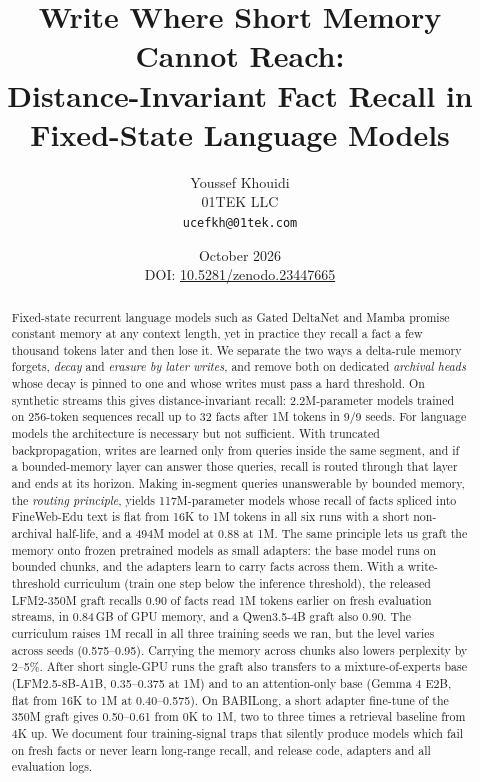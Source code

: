 \documentclass[11pt]{article}
\title{Write Where Short Memory Cannot Reach:\\Distance-Invariant Fact Recall in Fixed-State Language Models}
\author{Youssef Khouidi\\01TEK LLC\\\texttt{ucefkh@01tek.com}}
\date{October 2026\\[2pt]\small DOI: \href{https://doi.org/10.5281/zenodo.23447665}{10.5281/zenodo.23447665}}
\begin{document}
\maketitle

\begin{abstract}
Fixed-state recurrent language models such as Gated DeltaNet and Mamba promise constant memory at any context length, yet in practice they recall a fact a few thousand tokens later and then lose it. We separate the two ways a delta-rule memory forgets, \emph{decay} and \emph{erasure by later writes}, and remove both on dedicated \emph{archival heads} whose decay is pinned to one and whose writes must pass a hard threshold. On synthetic streams this gives distance-invariant recall: 2.2M-parameter models trained on 256-token sequences recall up to 32 facts after 1M tokens in 9/9 seeds. For language models the architecture is necessary but not sufficient. With truncated backpropagation, writes are learned only from queries inside the same segment, and if a bounded-memory layer can answer those queries, recall is routed through that layer and ends at its horizon. Making in-segment queries unanswerable by bounded memory, the \emph{routing principle}, yields 117M-parameter models whose recall of facts spliced into FineWeb-Edu text is flat from 16K to 1M tokens in all six runs with a short non-archival half-life, and a 494M model at 0.88 at 1M. The same principle lets us graft the memory onto frozen pretrained models as small adapters: the base model runs on bounded chunks, and the adapters learn to carry facts across them. With a write-threshold curriculum (train one step below the inference threshold), the released LFM2-350M graft recalls 0.90 of facts read 1M tokens earlier on fresh evaluation streams, in 0.84\,GB of GPU memory, and a Qwen3.5-4B graft also 0.90. The curriculum raises 1M recall in all three training seeds we ran, but the level varies across seeds (0.575--0.95). Carrying the memory across chunks also lowers perplexity by 2--5\%. After short single-GPU runs the graft also transfers to a mixture-of-experts base (LFM2.5-8B-A1B, 0.35--0.375 at 1M) and to an attention-only base (Gemma 4 E2B, flat from 16K to 1M at 0.40--0.575). On BABILong, a short adapter fine-tune of the 350M graft gives 0.50--0.61 from 0K to 1M, two to three times a retrieval baseline from 4K up. We document four training-signal traps that silently produce models which fail on fresh facts or never learn long-range recall, and release code, adapters and all evaluation logs.
\end{abstract}
\end{document}
